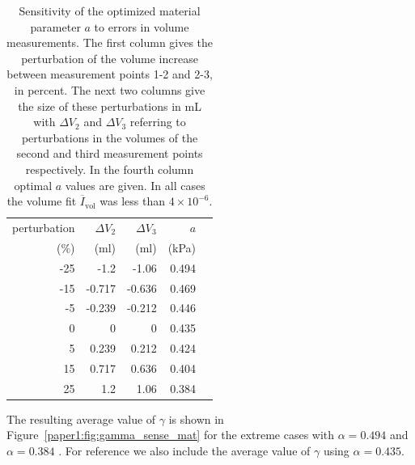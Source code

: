 \begin{table}
\caption{Sensitivity of the optimized material parameter $a$ to errors in volume measurements.
The first column gives the perturbation of the volume increase 
between measurement points 1-2 and 2-3, in percent. 
The next two columns give the size of these perturbations in mL with $\Delta V_2$ 
and $\Delta V_3$ referring to perturbations in the 
volumes of the second and third measurement points respectively. In the fourth column 
optimal $a$ values are given. In all cases 
the volume fit $\overline{I}_{\mathrm{vol}}$ was less than $4 \times 10^{-6}$.}
\begin{tabular}{rrrrr}
\hline
	 perturbation  &   $\Delta V_2$ &   $\Delta V_3$ &      $a$ \\
                ($\%$) &   (ml) &   (ml) &      (kPa) \\
\hline
                   -25 &              -1.2   &              -1.06  &    0.494 \\
                   -15 &              -0.717 &              -0.636 &    0.469 \\
                    -5 &              -0.239 &              -0.212 &    0.446 \\
                     0 &               0     &               0     &    0.435 \\
                     5 &               0.239 &               0.212 &    0.424 \\
                    15 &               0.717 &               0.636 &    0.404 \\
                    25 &               1.2   &               1.06  &    0.384 \\
\hline
\end{tabular}
\label{paper1:tab:passive_synth_opt}
\end{table}

The resulting average value of $\gamma$ is shown in
Figure~\ref{paper1:fig:gamma_sense_mat} for the extreme cases
with $\alpha = 0.494$ and $\alpha = 0.384$ . For reference we also include the
average value of $\gamma$ using $\alpha = 0.435$.
 
